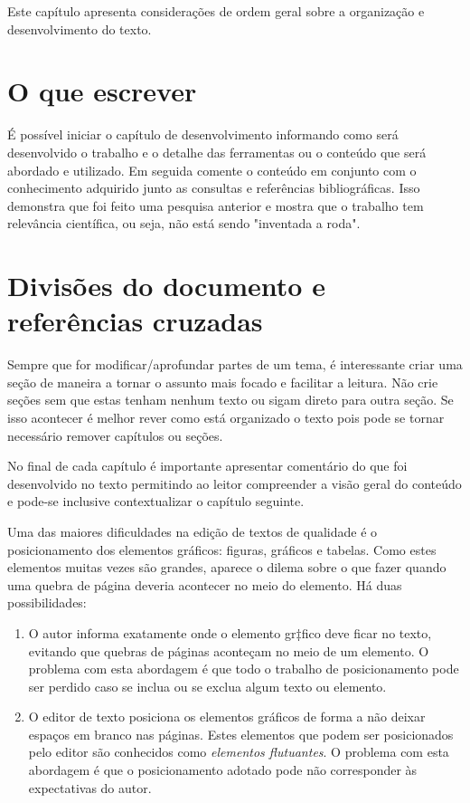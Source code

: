 
\label{Cap:desenvolvimento}

Este capítulo apresenta considerações de ordem geral sobre a
organização e desenvolvimento do texto.

\section{O que escrever}
\label{Sec:oque}

É possível iniciar o capítulo de desenvolvimento informando como será desenvolvido o trabalho e o detalhe das ferramentas ou o conteúdo que será abordado e utilizado. Em seguida comente o conteúdo em conjunto com o conhecimento adquirido junto as consultas e referências bibliográficas. 
Isso demonstra que foi feito uma pesquisa anterior e mostra que o trabalho tem relevância científica, ou seja, não está sendo "inventada a roda". 

\section{Divisões do documento e referências cruzadas}
\label{Sec:divisoes}

Sempre que for modificar/aprofundar partes de um tema, é interessante criar uma seção de maneira a tornar o assunto mais focado e facilitar a leitura. 
Não crie seções sem que estas tenham nenhum texto ou sigam direto para outra seção. Se isso acontecer é melhor rever como está organizado o texto pois pode se tornar necessário remover capítulos ou seções. 

No final de cada capítulo é importante apresentar comentário do que foi desenvolvido no texto permitindo ao leitor compreender a visão geral do conteúdo e pode-se inclusive contextualizar o capítulo seguinte.



\label{Cap:figuras}

Uma das maiores dificuldades na edição de textos de qualidade é o
posicionamento dos elementos gráficos: figuras, gráficos e
tabelas. Como estes elementos muitas vezes são grandes, aparece o
dilema sobre o que fazer quando uma quebra de página deveria acontecer
no meio do elemento. Há duas possibilidades:
\begin{enumerate}
\item O autor informa exatamente onde o elemento gr‡fico deve ficar no
texto, evitando que quebras de páginas aconteçam no meio de um
elemento. O problema com esta abordagem é que todo o trabalho de
posicionamento pode ser perdido caso se inclua ou se exclua algum
texto ou elemento.
\item O editor de texto posiciona os elementos gráficos de forma a não
deixar espaços em branco nas páginas. Estes elementos que podem ser
posicionados pelo editor são conhecidos como \emph{elementos
flutuantes}. O problema com esta abordagem é que o posicionamento
adotado pode não corresponder às expectativas do autor.
\end{enumerate}



